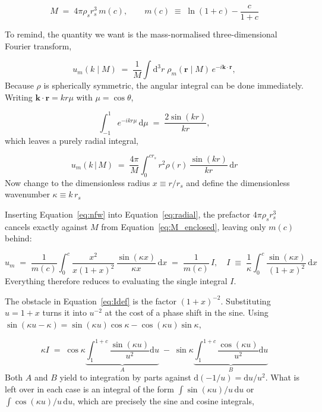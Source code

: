 \documentclass{article}
\newcommand{\dd}{\mathrm{d}}
\newcommand{\br}{\mathbf{r}}
\newcommand{\bk}{\mathbf{k}}
\begin{document}
\begin{equation} \label{eq:M_enclosed}
  M \;=\; 4\pi\rho_s r_s^{3}\,m(c),
  \qquad
  m(c) \;\equiv\; \ln(1+c)-\frac{c}{1+c}
\end{equation}
 
To remind, the quantity we want is the mass-normalised three-dimensional Fourier transform,
 
\begin{equation} \label{eq:udef}
  u_m(k \mid M) \;=\; \frac{1}{M} \int \dd^3r \; \rho_m(\br \mid M) \, e^{-i \bk \cdot \br},
\end{equation}
Because $\rho$ is spherically symmetric, the angular integral can be done
immediately. Writing $\bk\cdot\br=kr\mu$ with $\mu=\cos\theta$, 

\begin{equation}
  \int_{-1}^{1} e^{-ikr\mu}\,\dd\mu \;=\; \frac{2\sin(kr)}{kr},
  \label{eq:angular}
\end{equation}
which leaves a purely radial integral,

\begin{equation}
  u_m(k\,|\,M) \;=\; \frac{4\pi}{M}\int_{0}^{cr_s} r^{2}\rho(r)\,
             \frac{\sin(kr)}{kr}\,\dd r
  \label{eq:radial}
\end{equation}
Now change to the dimensionless radius $x\equiv r/r_s$ and define the
dimensionless wavenumber $\kappa \equiv k\,r_s$
 
Inserting Equation~\eqref{eq:nfw} into Equation~\eqref{eq:radial}, the prefactor
$4\pi\rho_s r_s^{3}$ cancels exactly against $M$ from Equation~\eqref{eq:M_enclosed},
leaving only $m(c)$ behind:
 
\begin{equation}
  u_m \;=\; \frac{1}{m(c)}\int_{0}^{c}
        \frac{x^{2}}{x(1+x)^{2}}\,\frac{\sin(\kappa x)}{\kappa x}\,\dd x
      \;=\; \frac{1}{m(c)}\,I,
  \quad
  I \;\equiv\; \frac{1}{\kappa}\int_{0}^{c}\frac{\sin(\kappa x)}{(1+x)^{2}}\,\dd x
  \label{eq:Idef}
\end{equation}
Everything therefore reduces to evaluating the single integral $I$.
 
The obstacle in Equation~\eqref{eq:Idef} is the factor $(1+x)^{-2}$. Substituting
$u=1+x$ turns it into $u^{-2}$ at the cost of a phase shift in the sine.
Using $\sin(\kappa u-\kappa)=\sin(\kappa u)\cos\kappa-\cos(\kappa u)\sin\kappa$,
 
\begin{equation}
  \kappa I \;=\; \cos\kappa \underbrace{\int_{1}^{1+c}\frac{\sin(\kappa u)}{u^{2}}\dd u}_{\textstyle A}
           \;-\; \sin\kappa \underbrace{\int_{1}^{1+c}\frac{\cos(\kappa u)}{u^{2}}\dd u}_{\textstyle B}
  \label{eq:AB}
\end{equation}
Both $A$ and $B$ yield to integration by parts against
$\dd\!\left(-1/u\right)=\dd u/u^{2}$. What is left over in each case is an
integral of the form $\int \sin(\kappa u)/u\,\dd u$ or
$\int \cos(\kappa u)/u\,\dd u$, which are precisely the sine and cosine
integrals,
 
\end{document}
